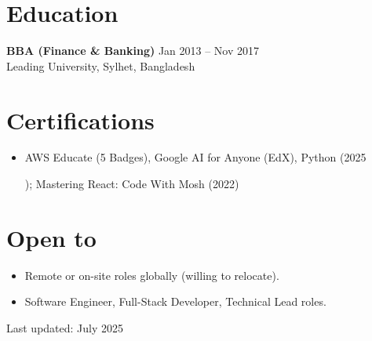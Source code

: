 \documentclass[a4paper,9pt]{article}
\begin{document}
\section*{Education}
\textbf{BBA (Finance \& Banking)} \hfill Jan 2013 – Nov 2017 \\
Leading University, Sylhet, Bangladesh

\section*{Certifications}
\begin{itemize}[leftmargin=*,itemsep=0.3pt]
    \item AWS Educate (5 Badges), Google AI for Anyone (EdX), Python (2025

    ); Mastering React: Code With Mosh (2022)
\end{itemize}

\section*{Open to}
\begin{itemize}[leftmargin=*,itemsep=0.3pt]
    \item Remote or on-site roles globally (willing to relocate).
    \item Software Engineer, Full-Stack Developer, Technical Lead roles.
\end{itemize}

\begin{center}
    \vspace{2mm}
    Last updated: July 2025
\end{center}
\end{document}
